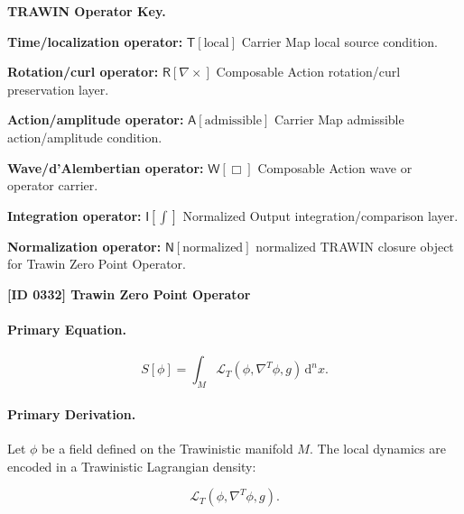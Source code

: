 \par\vspace{0.45\baselineskip}
\noindent\begin{minipage}[t]{\linewidth}
\begingroup
\small
\raggedright
\textbf{TRAWIN Operator Key.}\par
\noindent\textbf{Time/localization operator:} $\mathsf{T}\!\left[\mathrm{local}\right]$ Carrier Map local source condition.\par
\noindent\textbf{Rotation/curl operator:} $\mathsf{R}\!\left[\nabla\times\right]$ Composable Action rotation/curl preservation layer.\par
\noindent\textbf{Action/amplitude operator:} $\mathsf{A}\!\left[\mathrm{admissible}\right]$ Carrier Map admissible action/amplitude condition.\par
\noindent\textbf{Wave/d'Alembertian operator:} $\mathsf{W}\!\left[\Box\right]$ Composable Action wave or operator carrier.\par
\noindent\textbf{Integration operator:} $\mathsf{I}\!\left[\int\right]$ Normalized Output integration/comparison layer.\par
\noindent\textbf{Normalization operator:} $\mathsf{N}\!\left[\mathrm{normalized}\right]$ normalized TRAWIN closure object for Trawin Zero Point Operator.\par
\endgroup
\end{minipage}

\clearpage
\noindent\textbf{[ID 0332] Trawin Zero Point Operator}\par
\vspace{0.35em}
\paragraph{Primary Equation.}
\begin{equation}
S[\phi]
=
\int_M
\mathcal{L}_T
\left(
\phi,\nabla^T\phi,g
\right)
\,\mathrm{d}^n x .
\end{equation}

\paragraph{Primary Derivation.}
Let $\phi$ be a field defined on the Trawinistic manifold $M$.  
The local dynamics are encoded in a Trawinistic Lagrangian density:

\begin{equation}
\mathcal{L}_T
\left(
\phi,\nabla^T\phi,g
\right).
\end{equation}

